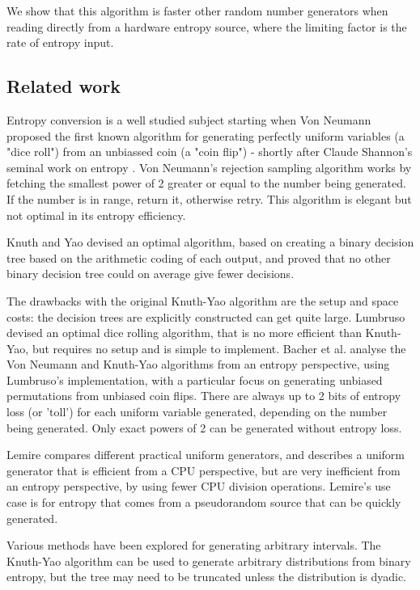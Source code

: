 \documentclass[12pt]{article}
\begin{document}
We show that this algorithm is faster other random number generators when reading directly from a hardware entropy source, where the limiting factor is the rate of entropy input.

\subsection{Related work}

Entropy conversion is a well studied subject starting when Von Neumann \cite{neumann51} proposed the first known algorithm for generating perfectly uniform variables (a "dice roll") from an unbiassed coin (a "coin flip") - shortly after Claude Shannon's seminal work on entropy \cite{shannon1948mathematical}. Von Neumann's rejection sampling algorithm works by fetching the smallest power of 2 greater or equal to the number being generated. If the number is in range, return it, otherwise retry. This algorithm is elegant but not optimal in its entropy efficiency.

Knuth and Yao \cite{Knuth1976TheCO} devised an optimal algorithm, based on creating a binary decision tree based on the arithmetic coding of each output, and proved that no other binary decision tree could on average give fewer decisions.

The drawbacks with the original Knuth-Yao algorithm are the setup and space costs: the decision trees are explicitly constructed can get quite large. Lumbruso \cite{lumbroso2013optimal} devised an optimal dice rolling algorithm, that is no more efficient than Knuth-Yao, but requires no setup and is simple to implement. Bacher et al. \cite{bacher2017} analyse the Von Neumann and Knuth-Yao algorithms from an entropy perspective, using Lumbruso's implementation, with a particular focus on generating unbiased permutations from unbiased coin flips. There are always up to 2 bits of entropy loss (or 'toll') for each uniform variable generated, depending on the number being generated. Only exact powers of 2 can be generated without entropy loss.

Lemire \cite{lemire2019fast} compares different practical uniform generators, and describes a uniform generator that is efficient from a CPU perspective, but are very inefficient from an entropy perspective, by using fewer CPU division operations. Lemire's use case is for entropy that comes from a pseudorandom source that can be quickly generated.

Various methods have been explored for generating arbitrary intervals.
The Knuth-Yao algorithm can be used to generate arbitrary distributions from binary entropy, but the tree may need to be truncated unless the distribution is dyadic.
\end{document}

